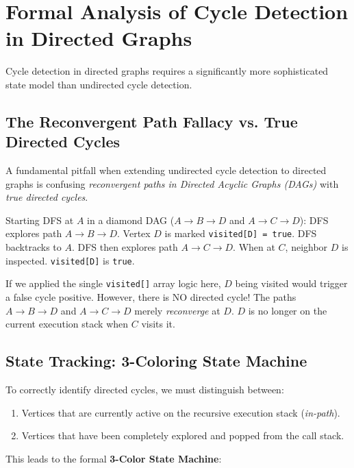 \documentclass[10pt,journal,compsoc,onecolumn]{IEEEtran}
\begin{document}
\section{Formal Analysis of Cycle Detection in Directed Graphs}
\label{sec:directed_cycle}

Cycle detection in directed graphs requires a significantly more sophisticated state model than undirected cycle detection.

\subsection{The Reconvergent Path Fallacy vs. True Directed Cycles}

A fundamental pitfall when extending undirected cycle detection to directed graphs is confusing \emph{reconvergent paths in Directed Acyclic Graphs (DAGs)} with \emph{true directed cycles}.

Starting DFS at $A$ in a diamond DAG ($A \to B \to D$ and $A \to C \to D$): DFS explores path $A \to B \to D$. Vertex $D$ is marked \texttt{visited[D] = true}. DFS backtracks to $A$. DFS then explores path $A \to C \to D$. When at $C$, neighbor $D$ is inspected. \texttt{visited[D]} is \texttt{true}.

If we applied the single \texttt{visited[]} array logic here, $D$ being visited would trigger a false cycle positive. However, there is NO directed cycle! The paths $A \to B \to D$ and $A \to C \to D$ merely \emph{reconverge} at $D$. $D$ is no longer on the current execution stack when $C$ visits it.

\subsection{State Tracking: 3-Coloring State Machine}

To correctly identify directed cycles, we must distinguish between:
\begin{enumerate}
    \item Vertices that are currently active on the recursive execution stack (\emph{in-path}).
    \item Vertices that have been completely explored and popped from the call stack.
\end{enumerate}

This leads to the formal \textbf{3-Color State Machine}:
\end{document}
